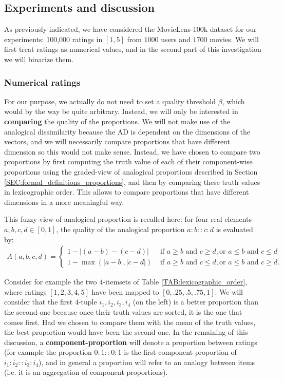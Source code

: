 \subsection{Experiments and discussion}

As previously indicated, we have considered the MovieLens-100k dataset for our experiments: 100,000
ratings in $[1, 5]$ from $1000$ users and $1700$ movies. We will first treat
ratings as numerical values, and in the second part of this investigation
we will binarize them.

\subsubsection{Numerical ratings}

For our purpose, we actually do not need to set a quality threshold $\beta$,
which would by the way be quite arbitrary. Instead, we will only be interested
in \textbf{comparing} the quality of the  proportions. We will not make use of
the analogical dissimilarity because the AD is dependent on the dimensions of
the vectors, and we will necessarily compare proportions that have different
dimension so this would not make sense. Instead, we have chosen to
compare two proportions by first computing the truth value of each of their
component-wise proportions using the graded-view of analogical proportions
described in Section \ref{SEC:formal_definitions_proportions}, and then by
comparing these truth values in lexicographic order. This allows to compare
proportions that have different dimensions in a more meaningful way.

This fuzzy view of analogical proportion is recalled here: for four real
elements $a, b, c, d \in [0, 1]$, the quality of the analogical proportion
$a:b::c:d$ is evaluated by:
\begin{align*}
A(a, b, c, d) =
\begin{cases}
  1 - |(a - b) - (c - d)| &\text{ if } a \geq b \text { and } c \geq d, \text{
    or } a \leq b \text{ and } c \leq d\\
  1 - \max(|a - b|, |c - d|) &\text{ if } a \geq b \text { and } c \leq d, \text{
    or } a \leq b \text{ and } c \geq d.
\end{cases}
\end{align*}

\begin{testexample}
Consider for example the two $4$-itemsets of Table
\ref{TAB:lexicographic_order}, where ratings $[1, 2, 3, 4, 5]$ have been mapped
to $[0, .25, .5, .75, 1]$. We will consider that the first $4$-tuple $i_1, i_2,
i_3, i_4$ (on the left) is a better proportion than the second one because
once their truth values are sorted, it is the one that comes first. Had we
chosen to compare them with the mean of the truth values, the best proportion
would have been the second one. In the remaining of this discussion, a
\textbf{component-proportion} will denote a proportion between ratings (for
example the proportion $0:1::0:1$ is the first component-proportion of
$i_1:i_2::i_3:i_4$), and in general a proportion  will refer to an analogy
between items (i.e. it is an aggregation of component-proportions).
\end{testexample}

